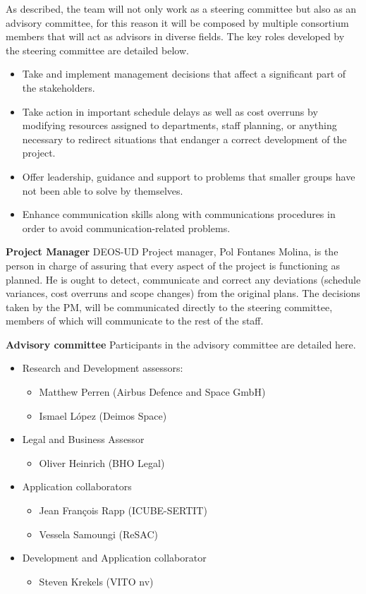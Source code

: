 As described, the team will not only work as a steering committee but also as an advisory committee, for this reason it will be composed by multiple consortium members that will act as advisors in diverse fields. 
The key roles developed by the steering committee are detailed below. 
 \begin{itemize}
 	\item	Take and implement management decisions that affect a significant part of the stakeholders. 
 	\item	Take action in important schedule delays as well as cost overruns by modifying resources assigned to departments, staff planning, or anything necessary to redirect situations that endanger a correct development of the project.
 	\item 	Offer leadership, guidance and support to problems that smaller groups have not been able to solve by themselves. 
 	\item Enhance communication skills along with communications procedures in order to avoid communication-related problems.
 \end{itemize}

\textbf{Project Manager}
\newline
\newline
DEOS-UD Project manager, Pol Fontanes Molina, is the person in charge of assuring that every aspect of the project is functioning as planned. He is ought to detect, communicate and correct any deviations (schedule variances, cost overruns and scope changes) from the original plans. The decisions taken by the PM, will be communicated directly to the steering committee, members of which will communicate to the rest of the staff.

\textbf{Advisory committee}
\newline
\newline
Participants in the advisory committee are detailed here.
 \begin{itemize}
 	\item  Research and Development assessors: 
 	\begin{itemize}
 		\item Matthew Perren (Airbus Defence and Space GmbH)
 		\item Ismael López (Deimos Space)
 	\end{itemize}
 \item 	Legal and Business Assessor
 \begin{itemize}
 	\item Oliver Heinrich (BHO Legal)
  \end{itemize}
\item Application collaborators
\begin{itemize}
	\item Jean François Rapp (ICUBE-SERTIT)
	\item Vessela Samoungi (ReSAC)
\end{itemize}
\item Development and Application collaborator
 \begin{itemize}
	\item Steven Krekels (VITO nv)
\end{itemize}
 \end{itemize}


